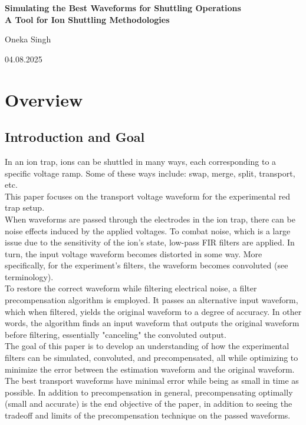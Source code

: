 \documentclass[11pt, a4paper]{article}
\theoremstyle{definition}
\numberwithin{equation}{section}
\begin{document}
    \nopagecolor
\begin{center}
        \text{}
	\vspace{5mm}
	\textbf{\Large Simulating the Best Waveforms for Shuttling Operations\\ \normalsize A Tool for Ion Shuttling Methodologies}
	
	\vspace{19mm}
	{\normalsize Oneka Singh \\}
	\vspace{5mm}
	
	{\normalsize 04.08.2025\\}
	\vspace{10mm}
\end{center}

\newpage

\begin{flushleft}
	\tableofcontents
\end{flushleft}

\newpage

\section{Overview}
\subsection{Introduction and Goal} 

In an ion trap, ions can be shuttled in many ways, each corresponding to a specific voltage ramp. Some of these ways include: swap, merge, split, transport, etc.
\\
This paper focuses on the transport voltage waveform for the experimental red trap setup. 
\\
When waveforms are passed through the electrodes in the ion trap, there can be noise effects induced by the applied voltages. To combat noise, which is a large issue due to the sensitivity of the ion's state, low-pass FIR filters are applied. In turn, the input voltage waveform becomes distorted in some way. More specifically, for the experiment's filters, the waveform becomes convoluted (see terminology).
\\
To restore the correct waveform while filtering electrical noise, a filter precompensation algorithm is employed. It passes an alternative input waveform, which when filtered, yields the original waveform to a degree of accuracy. In other words, the algorithm finds an input waveform that outputs the original waveform before filtering, essentially "canceling" the convoluted output.
\\
The goal of this paper is to develop an understanding of how the experimental filters can be simulated, convoluted, and precompensated, all while optimizing to minimize the error between the estimation waveform and the original waveform. The best transport waveforms have minimal error while being as small in time as possible. In addition to precompensation in general, precompensating optimally (small and accurate) is the end objective of the paper, in addition to seeing the tradeoff and limits of the precompensation technique on the passed waveforms.
\end{document}
